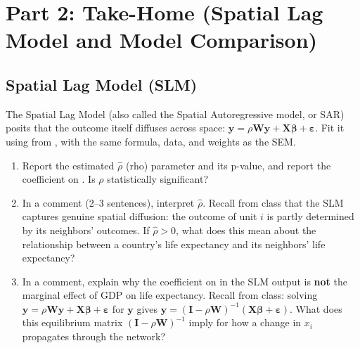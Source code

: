 \newpage

\section{Part 2: Take-Home (Spatial Lag Model and Model Comparison)}

\subsection{Spatial Lag Model (SLM)}

The Spatial Lag Model (also called the Spatial Autoregressive model, or SAR) posits that the outcome itself diffuses across space: $\mathbf{y} = \rho \mathbf{W}\mathbf{y} + \mathbf{X}\boldsymbol{\beta} + \boldsymbol{\varepsilon}$. Fit it using  from , with the same formula, data, and weights as the SEM.

\begin{enumerate}[label=\alph*)]

  \item Report the estimated $\hat{\rho}$ (rho) parameter and its p-value, and report the coefficient on . Is $\rho$ statistically significant?

  \item In a comment (2--3 sentences), interpret $\hat{\rho}$. Recall from class that the SLM captures genuine spatial diffusion: the outcome of unit $i$ is partly determined by its neighbors' outcomes. If $\hat{\rho} > 0$, what does this mean about the relationship between a country's life expectancy and its neighbors' life expectancy?

  \item In a comment, explain why the coefficient on  in the SLM output is \textbf{not} the marginal effect of GDP on life expectancy. Recall from class: solving $\mathbf{y} = \rho\mathbf{W}\mathbf{y} + \mathbf{X}\boldsymbol{\beta} + \boldsymbol{\varepsilon}$ for $\mathbf{y}$ gives $\mathbf{y} = (\mathbf{I} - \rho\mathbf{W})^{-1}(\mathbf{X}\boldsymbol{\beta} + \boldsymbol{\varepsilon})$. What does this equilibrium matrix $(\mathbf{I} - \rho\mathbf{W})^{-1}$ imply for how a change in $x_i$ propagates through the network?

\end{enumerate}


